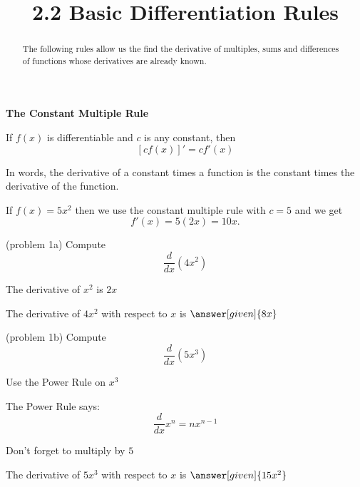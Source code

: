 \documentclass{ximera}
\title{2.2 Basic Differentiation Rules}
\begin{document}
\begin{abstract}
The following rules allow us the find the derivative of multiples, sums and differences of functions 
whose derivatives are already known.
\end{abstract}


\maketitle



\begin{center}
\bf{The Constant Multiple Rule}
\end{center}


\begin{theorem} If $f(x)$ is differentiable and $c$ is any constant, then
\[[cf(x)]' = c f'(x)\]
\end{theorem}

In words, the derivative of a constant times a function is the constant times the derivative of the function.\\



\begin{example}[example 1]
 If $f(x) = 5x^2$ then  we use the constant multiple rule with $c = 5$ and we get 
\[
f'(x) = 5(2x)  = 10x.
\]
\end{example}


\begin{problem}(problem 1a)
  Compute 
  \[
  \frac{d}{dx} \left(4x^2\right)
  \]
  
    \begin{hint}
      The derivative of $x^2$ is $2x$
    \end{hint}    
		The derivative of $4x^2$ with respect to $x$ is
		 $\answer[given]{8x}$
	
\end{problem}



\begin{problem}(problem 1b)
  Compute 
  \[
  \frac{d}{dx} \left(5x^3\right)
  \]
  
    \begin{hint}
      Use the Power Rule on $x^3$
    \end{hint}
    \begin{hint}
      The Power Rule says:
      \[
      \frac{d}{dx} x^n = nx^{n-1}
      \]
    \end{hint}
		\begin{hint}
		  Don't forget to multiply by $5$
		\end{hint}
		The derivative of $5x^3$ with respect to $x$ is
		 $\answer[given]{15x^2}$
	
\end{problem}
\end{document}
